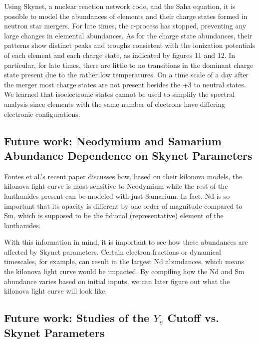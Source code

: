\documentclass[11pt,a4paper]{article}
\begin{document}
Using Skynet, a nuclear reaction network code, and the Saha equation, it is possible to model the abundances of elements and their charge states formed in neutron star mergers. For late times, the r-process has stopped, preventing any large changes in elemental abundances. As for the charge state abundances, their patterns show distinct peaks and troughs consistent with the ionization potentials of each element and each charge state, as indicated by figures 11 and 12. 
In particular, for late times, there are little to no transitions in the dominant charge state present due to the rather low temperatures. On a time scale of a day after the merger most charge states are not present besides the +3 to neutral states. 
We learned that isoelectronic states cannot be used to simplify the spectral analysis since elements with the same number of electrons have differing electronic configurations. \\

\subsection{Future work: Neodymium and Samarium Abundance Dependence on Skynet Parameters}

Fontes et al.'s recent paper \cite{Fontes_2020} discusses how, based on their kilonova models, the kilonova light curve is most sensitive to Neodymium while the rest of the lanthanides present can be modeled with just Samarium. In fact, Nd is so important that its opacity is different by one order of magnitude compared to Sm, which is supposed to be the fiducial (representative) element of the lanthanides. 

With this information in mind, it is important to see how these abundances are affected by Skynet parameters. Certain electron fractions or dynamical timescales, for example, can result in the largest Nd abundances, which means the kilonova light curve would be impacted. By compiling how the Nd and Sm abundance varies based on initial inputs, we can later figure out what the kilonova light curve will look like. 


\subsection{Future work: Studies of the $Y_e$ Cutoff vs. Skynet Parameters}
\end{document}
